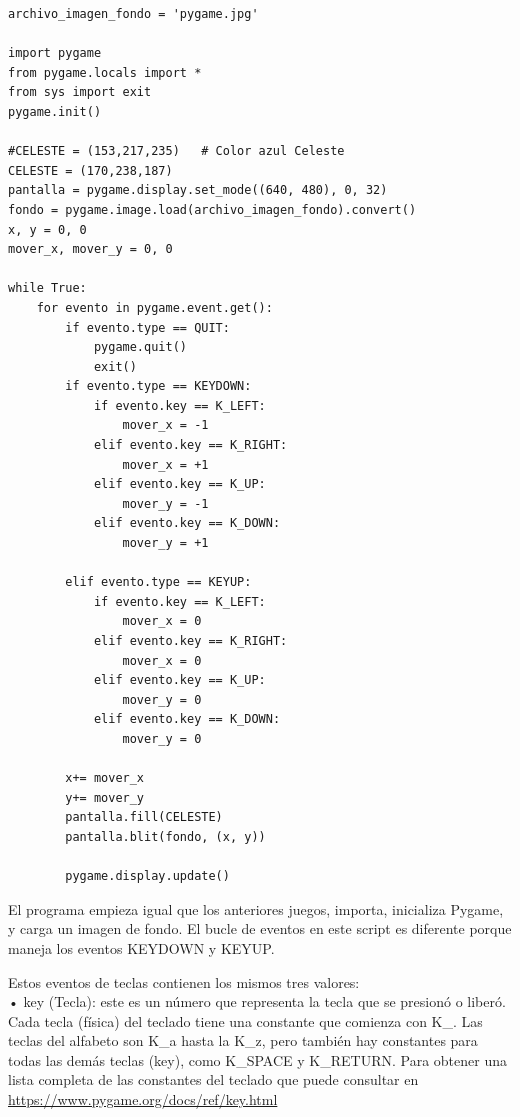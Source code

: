 \hspace{-2.9cm}{\ttfamily \scriptsize movimientos}

\vspace{-0.2cm}
\hspace{-2.5cm}{\ttfamily \scriptsize \_fondo.py}\vspace{-0.84cm}
\begin{lstlisting}		
archivo_imagen_fondo = 'pygame.jpg'

import pygame
from pygame.locals import *
from sys import exit
pygame.init()

#CELESTE = (153,217,235)   # Color azul Celeste 
CELESTE = (170,238,187)
pantalla = pygame.display.set_mode((640, 480), 0, 32)
fondo = pygame.image.load(archivo_imagen_fondo).convert()
x, y = 0, 0
mover_x, mover_y = 0, 0

while True:
    for evento in pygame.event.get():
        if evento.type == QUIT:
            pygame.quit()
            exit()
        if evento.type == KEYDOWN:
            if evento.key == K_LEFT:
                mover_x = -1
            elif evento.key == K_RIGHT:
                mover_x = +1
            elif evento.key == K_UP:
                mover_y = -1
            elif evento.key == K_DOWN:
                mover_y = +1

        elif evento.type == KEYUP:
            if evento.key == K_LEFT:
                mover_x = 0
            elif evento.key == K_RIGHT:
                mover_x = 0
            elif evento.key == K_UP:
                mover_y = 0
            elif evento.key == K_DOWN:
                mover_y = 0
              
        x+= mover_x
        y+= mover_y
        pantalla.fill(CELESTE)
        pantalla.blit(fondo, (x, y))
   
        pygame.display.update()
\end{lstlisting}

El programa empieza igual que los anteriores juegos, importa, inicializa Pygame, y carga un
imagen de fondo. El bucle de eventos en este  {\ttfamily script} es diferente porque maneja los eventos  {\ttfamily KEYDOWN} y
 {\ttfamily KEYUP}. 
 
Estos eventos de teclas contienen los mismos tres valores:\\
 
• key (Tecla): este es un número que representa la tecla que se presionó o liberó. Cada tecla (física) del teclado tiene
una constante que comienza con {\ttfamily  K\_}. Las teclas del alfabeto son {\ttfamily  K\_a} hasta la 
{\ttfamily  K\_z}, pero también hay constantes para todas las demás  teclas (key), como {\ttfamily  K\_SPACE} y
{\ttfamily K\_RETURN}.  Para obtener una lista completa de las constantes del teclado que puede consultar en
 \href{https://www.pygame.org/docs/ref/key.html}{\color{vino}https://www.pygame.org/docs/ref/key.html}\\

